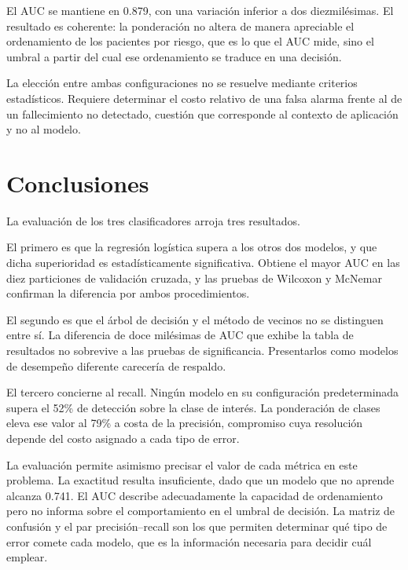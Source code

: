 \documentclass[11pt]{article}
\begin{document}
El AUC se mantiene en 0.879, con una variación inferior a dos diezmilésimas. El resultado es
coherente: la ponderación no altera de manera apreciable el ordenamiento de los pacientes por
riesgo, que es lo que el AUC mide, sino el umbral a partir del cual ese ordenamiento se traduce en
una decisión.

La elección entre ambas configuraciones no se resuelve mediante criterios estadísticos. Requiere
determinar el costo relativo de una falsa alarma frente al de un fallecimiento no detectado,
cuestión que corresponde al contexto de aplicación y no al modelo.

\section{Conclusiones}

La evaluación de los tres clasificadores arroja tres resultados.

El primero es que la regresión logística supera a los otros dos modelos, y que dicha superioridad
es estadísticamente significativa. Obtiene el mayor AUC en las diez particiones de validación
cruzada, y las pruebas de Wilcoxon y McNemar confirman la diferencia por ambos procedimientos.

El segundo es que el árbol de decisión y el método de vecinos no se distinguen entre sí. La
diferencia de doce milésimas de AUC que exhibe la tabla de resultados no sobrevive a las pruebas
de significancia. Presentarlos como modelos de desempeño diferente carecería de respaldo.

El tercero concierne al recall. Ningún modelo en su configuración predeterminada supera el 52\% de
detección sobre la clase de interés. La ponderación de clases eleva ese valor al 79\% a costa de
la precisión, compromiso cuya resolución depende del costo asignado a cada tipo de error.

La evaluación permite asimismo precisar el valor de cada métrica en este problema. La exactitud
resulta insuficiente, dado que un modelo que no aprende alcanza 0.741. El AUC describe
adecuadamente la capacidad de ordenamiento pero no informa sobre el comportamiento en el umbral de
decisión. La matriz de confusión y el par precisión–recall son los que permiten determinar qué
tipo de error comete cada modelo, que es la información necesaria para decidir cuál emplear.

\printbibliography[title={Referencias}]
\end{document}
